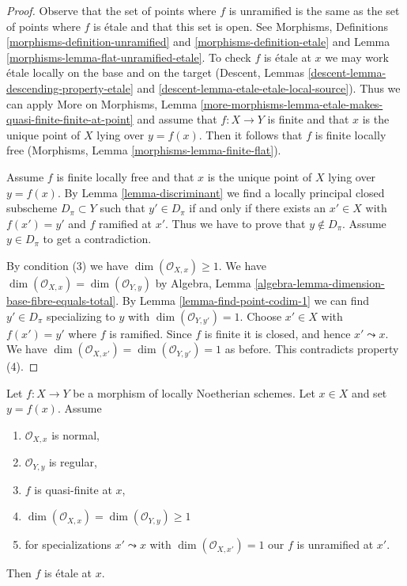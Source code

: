 \begin{proof}
Observe that the set of points where $f$ is unramified is the same as
the set of points where $f$ is \'etale and that this set is open.
See Morphisms, Definitions \ref{morphisms-definition-unramified}
and \ref{morphisms-definition-etale} and
Lemma \ref{morphisms-lemma-flat-unramified-etale}.
To check $f$ is \'etale at $x$ we may work \'etale
locally on the base and on the
target (Descent, Lemmas \ref{descent-lemma-descending-property-etale} and
\ref{descent-lemma-etale-etale-local-source}).
Thus we can apply More on Morphisms, Lemma
\ref{more-morphisms-lemma-etale-makes-quasi-finite-finite-at-point}
and assume that $f : X \to Y$ is finite and that $x$ is the unique
point of $X$ lying over $y = f(x)$.
Then it follows that $f$ is finite locally free
(Morphisms, Lemma \ref{morphisms-lemma-finite-flat}).

\medskip\noindent
Assume $f$ is finite locally free and that $x$ is the unique point of
$X$ lying over $y = f(x)$. By Lemma \ref{lemma-discriminant}
we find a locally principal closed subscheme $D_\pi \subset Y$
such that $y' \in D_\pi$ if and only if there exists an $x' \in X$
with $f(x') = y'$ and $f$ ramified at $x'$. Thus we have to prove
that $y \not \in D_\pi$. Assume $y \in D_\pi$ to get a contradiction.

\medskip\noindent
By condition (3) we have $\dim(\mathcal{O}_{X, x}) \geq 1$.
We have $\dim(\mathcal{O}_{X, x}) = \dim(\mathcal{O}_{Y, y})$ by
Algebra, Lemma \ref{algebra-lemma-dimension-base-fibre-equals-total}.
By Lemma \ref{lemma-find-point-codim-1}
we can find $y' \in D_\pi$ specializing to $y$
with $\dim(\mathcal{O}_{Y, y'}) = 1$.
Choose $x' \in X$ with $f(x') = y'$ where $f$ is ramified. Since $f$
is finite it is closed, and hence $x' \leadsto x$.
We have $\dim(\mathcal{O}_{X, x'}) = \dim(\mathcal{O}_{Y, y'}) = 1$
as before. This contradicts property (4).
\end{proof}

\begin{lemma}
\label{lemma-purity}
Let $f : X \to Y$ be a morphism of locally Noetherian schemes.
Let $x \in X$ and set $y = f(x)$. Assume
\begin{enumerate}
\item $\mathcal{O}_{X, x}$ is normal,
\item $\mathcal{O}_{Y, y}$ is regular,
\item $f$ is quasi-finite at $x$,
\item $\dim(\mathcal{O}_{X, x}) = \dim(\mathcal{O}_{Y, y}) \geq 1$
\item for specializations $x' \leadsto x$ with
$\dim(\mathcal{O}_{X, x'}) = 1$ our $f$ is unramified at $x'$.
\end{enumerate}
Then $f$ is \'etale at $x$.
\end{lemma}

